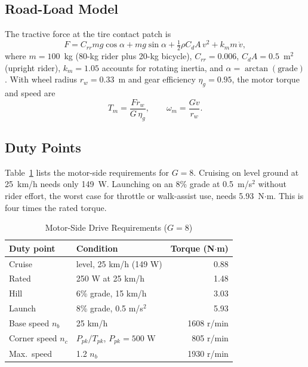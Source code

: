 \documentclass[journal]{IEEEtran}
\begin{document}
\subsection{Road-Load Model}
The tractive force at the tire contact patch is
\begin{equation}
F = C_{rr} m g\cos\alpha + m g \sin\alpha + \tfrac12 \rho C_dA\, v^2 + k_m m\, \dot v,
\label{eq:roadload}
\end{equation}
where $m=100$~kg (80-kg rider plus 20-kg bicycle), $C_{rr}=0.006$,
$C_dA=0.5$~m$^2$ (upright rider), $k_m=1.05$ accounts for rotating inertia,
and $\alpha=\arctan(\text{grade})$. With wheel radius $r_w=0.33$~m and gear
efficiency $\eta_g=0.95$, the motor torque and speed are
\begin{equation}
T_m = \frac{F r_w}{G\,\eta_g}, \qquad \omega_m = \frac{G v}{r_w}.
\label{eq:motortorque}
\end{equation}

\subsection{Duty Points}
Table~\ref{tab:duty} lists the motor-side requirements for $G=8$. Cruising on
level ground at 25~km/h needs only 149~W. Launching on an 8\% grade at
0.5~m/s$^2$ without rider effort, the worst case for throttle or walk-assist use,
needs 5.93~N$\cdot$m. This is four times the rated torque.

\begin{table}[!t]
\caption{Motor-Side Drive Requirements ($G = 8$)}
\label{tab:duty}
\centering
\renewcommand{\arraystretch}{1.1}
\begin{tabular}{l l r}
\hline
Duty point & Condition & Torque (N$\cdot$m)\\
\hline
Cruise & level, 25 km/h (149 W) & 0.88\\
Rated & 250 W at 25 km/h & 1.48\\
Hill & 6\% grade, 15 km/h & 3.03\\
Launch & 8\% grade, 0.5 m/s$^2$ & 5.93\\
\hline
Base speed $n_b$ & 25 km/h & 1608 r/min\\
Corner speed $n_c$ & $P_{pk}/T_{pk}$, $P_{pk}=500$ W & 805 r/min\\
Max.\ speed & 1.2 $n_b$ & 1930 r/min\\
\hline
\end{tabular}
\end{table}
\end{document}

